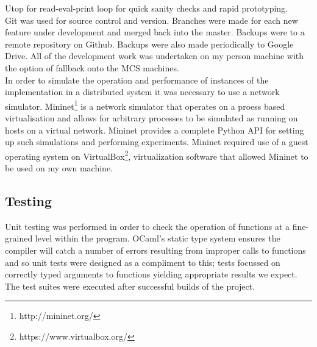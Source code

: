 Utop for read-eval-print loop for quick sanity checks and rapid prototyping. \\

Git was used for source control and version. Branches were made for each new feature under development and merged back into the master. Backups were to a remote repository on Github. Backups were also made periodically to Google Drive. All of the development work was undertaken on my person machine with the option of fallback onto the MCS machines. \\

In order to simulate the operation and performance of instances of the implementation in a distributed system it was necessary to use a network simulator. Mininet\footnote{http://mininet.org/} is a network simulator that operates on a proess based virtualisation and allows for arbitrary processes to be simulated as running on hosts on a virtual network. Mininet provides a complete Python API for setting up such simulations and performing experiments. Mininet required use of a guest operating system on VirtualBox\footnote{https://www.virtualbox.org/}, virtualization software that allowed Mininet to be used on my own machine.

\subsection{Testing}
\label{subsection-testing}
Unit testing was performed in order to check the operation of functions at a fine-grained level within the program. OCaml's static type system ensures the compiler will catch a number of errors resulting from improper calls to functions and so unit tests were designed as a compliment to this; tests focussed on correctly typed arguments to functions yielding appropriate results we expect. The test suites were executed after successful builds of the project. \\






